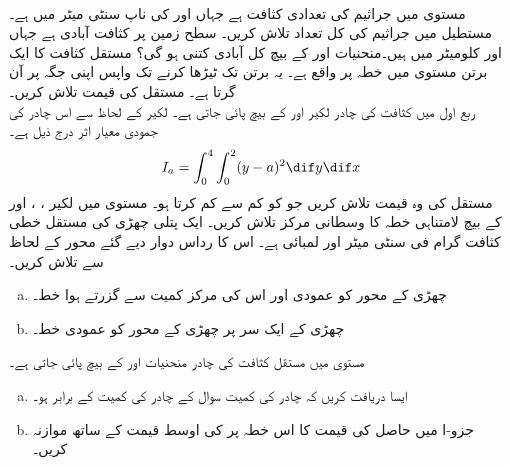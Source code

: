 \\
مستوی  میں جراثیم   کی تعدادی کثافت  ہے جہاں  اور  کی ناپ سنٹی میٹر میں ہے۔ مستطیل  میں جراثیم کی کل تعداد تلاش کریں۔
سطح زمین پر  کثافت آبادی  ہے جہاں  اور  کلومیٹر میں ہیں۔منحنیات  اور  کے بیچ کل آبادی کتنی ہو گی؟
مستقل کثافت کا ایک برتن مستوی  میں خطہ  پر واقع ہے۔ یہ برتن    تک ٹیڑھا کرنے تک واپس اپنی جگہ پر آن گرتا ہے۔ مستقل  کی قیمت تلاش کریں۔
\\
ربع اول میں کثافت  کی چادر  لکیر  اور  کے بیچ  پائی جاتی ہے۔ لکیر  کے لحاظ سے اس چادر کی جمودی معیار اثر  درج ذیل ہے۔
\begin{align*}
I_a=\int_0^4\int_0^2(y-a)^2\dif y\dif x
\end{align*}
مستقل  کی وہ قیمت تلاش کریں جو  کو کم سے کم کرتا ہو۔
مستوی  میں لکیر ، ،  اور   کے بیچ لامتناہی خطہ کا وسطانی مرکز تلاش کریں۔
ایک پتلی چھڑی   کی مستقل  خطی کثافت  گرام فی  سنٹی میٹر   اور لمبائی  ہے۔  اس کا رداس دوار  دیے گئے محور کے لحاظ سے تلاش کریں۔
\begin{enumerate}[a.]
\item
چھڑی کے محور کو عمودی اور اس کی مرکز کمیت سے گزرتے ہوا خط۔
\item
چھڑی کے ایک سر پر چھڑی کے محور کو عمودی خط۔ 
\end{enumerate}
مستوی  میں مستقل کثافت   کی چادر منحنیات  اور  کے بیچ پائی جاتی ہے۔
\begin{enumerate}[a.]
\item
ایسا   دریافت کریں کہ چادر کی  کمیت   سوال  کے چادر کی کمیت کے برابر ہو۔
\item
جزو-ا میں حاصل  کی قیمت کا اس خطہ پر   کی اوسط قیمت کے ساتھ موازنہ کریں۔
\end{enumerate}
